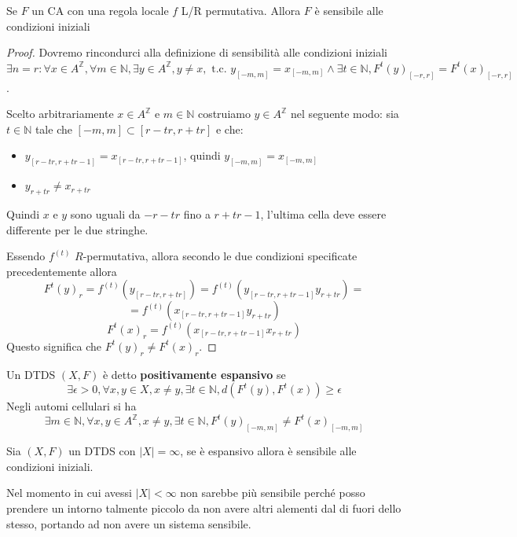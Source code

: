 \begin{nota}
    Se $F$ un CA con una regola locale $f$ L/R permutativa. Allora $F$ è sensibile 
    alle condizioni iniziali
    \begin{proof}
        Dovremo rincondurci alla definizione di sensibilità alle condizioni iniziali
        $\exists n=r: \forall x\in A^\mathbb{Z}, \forall m\in \mathbb{N},
        \exists y \in A^\mathbb{Z}, y\ne x, \text{ t.c. } y_{[-m,m]} = x_{[-m,m]}\land 
        \exists t\in \mathbb{N},F^t(y)_{[-r,r]} =F^t(x)_{[-r,r]}$.

        Scelto arbitrariamente $x\in A^\mathbb{Z}$ e $m\in \mathbb{N}$ costruiamo
        $y\in A^\mathbb{Z}$ nel seguente modo: sia $t\in\mathbb{N}$ tale che 
        $[-m,m]\subset [r-tr,r+tr]$ e che:
        \begin{itemize}
            \item $y_{[r-tr, r+tr-1]} = x_{[r-tr, r+tr-1]}$, quindi $y_{[-m,m]} = x_{[-m,m]}$
            \item $y_{r+tr} \ne x_{r+tr}$
        \end{itemize} 
        Quindi $x$ e $y$ sono uguali da $-r-tr$ fino a $r+tr-1$, l'ultima cella 
        deve essere differente per le due stringhe.

        Essendo $f^{(t)}$ $R$-permutativa, allora secondo le due condizioni 
        specificate precedentemente allora 
        $$F^t(y)_r=f^{(t)}(y_{[r-tr, r+tr]})=f^{(t)}(y_{[r-tr, r+tr-1]}y_{r+tr})=$$
        $$=f^{(t)}(x_{[r-tr, r+tr-1]}y_{r+tr})$$
        $$F^t(x)_r=f^{(t)}(x_{[r-tr, r+tr-1]}x_{r+tr}) $$
        Questo significa che $F^t(y)_r \ne F^t(x)_r$.
    \end{proof}
\end{nota}

\begin{definizione}
    Un DTDS $(X,F)$ è detto \textbf{positivamente espansivo} se 
    $$\exists \epsilon >0, \forall x,y\in X, x\ne y, \exists t\in \mathbb{N}, d(F^t(y),F^t(x))\ge \epsilon$$
    Negli automi cellulari si ha
    $$\exists m\in \mathbb{N}, \forall x,y\in A^\mathbb{Z}, x\ne y, \exists t\in \mathbb{N}, F^t(y)_{[-m,m]} \ne F^t(x)_{[-m,m]}$$
\end{definizione}

\begin{teorema}
    Sia $(X,F)$ un DTDS con $|X|=\infty$, se è espansivo allora è sensibile alle condizioni iniziali.

    Nel momento in cui avessi $|X|<\infty$ non sarebbe più sensibile perché posso
    prendere un intorno talmente piccolo da non avere altri alementi dal di fuori 
    dello stesso, portando ad non avere un sistema sensibile. 
\end{teorema}

